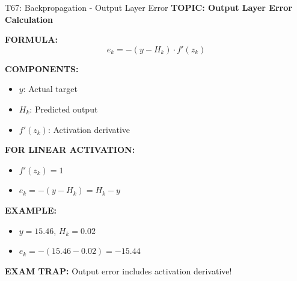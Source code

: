 \documentclass[8pt]{beamer}
\begin{document}
	\begin{frame}{T67: Backpropagation - Output Layer Error}
		\fontsize{6.5}{7.5}\selectfont
		\textbf{TOPIC: Output Layer Error Calculation}
		
		\vspace{0.1cm}
		\textbf{FORMULA:}
		\[
		e_k = -(y - H_k) \cdot f'(z_k)
		\]
		
		\vspace{0.1cm}
		\textbf{COMPONENTS:}
		\begin{itemize}
			\item $y$: Actual target
			\item $H_k$: Predicted output
			\item $f'(z_k)$: Activation derivative
		\end{itemize}
		
		\vspace{0.1cm}
		\textbf{FOR LINEAR ACTIVATION:}
		\begin{itemize}
			\item $f'(z_k) = 1$
			\item $e_k = -(y - H_k) = H_k - y$
		\end{itemize}
		
		\vspace{0.1cm}
		\textbf{EXAMPLE:}
		\begin{itemize}
			\item $y = 15.46$, $H_k = 0.02$
			\item $e_k = -(15.46 - 0.02) = -15.44$
		\end{itemize}
		
		\textcolor{myred}{\textbf{EXAM TRAP:}} Output error includes \textcolor{myblue}{activation derivative}!
	\end{frame}
	
\end{document}
